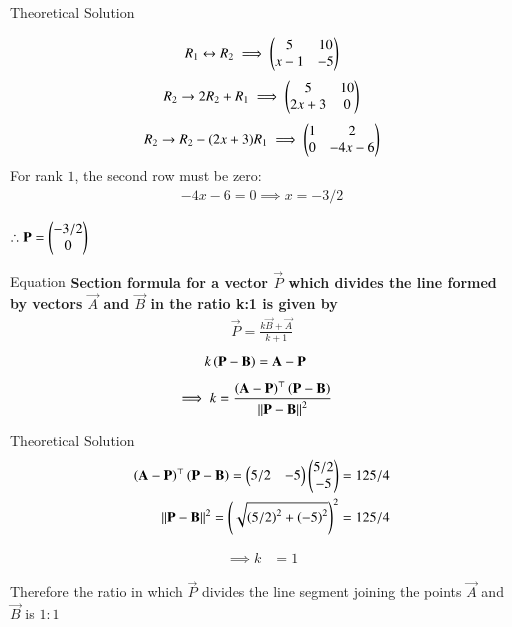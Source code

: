 \documentclass{beamer}
\begin{document}
\begin{frame}{Theoretical Solution}

\begin{align}
R_1 \leftrightarrow R_2 \implies \begin{pmatrix}5 & 10\\x-1 & -5\end{pmatrix}
\end{align}
\begin{align}
R_2 \rightarrow 2R_2 + R_1 \implies \begin{pmatrix}5 & 10\\2x+3 & 0\end{pmatrix}
\end{align}
\begin{align}
R_2 \rightarrow R_2-(2x+3)R_1 \implies \begin{pmatrix}1 & 2 \\ 0 & -4x-6\end{pmatrix}
\end{align}
For rank $1$, the second row must be zero:
\begin{align}
    -4x-6=0 \implies x=-3/2
\end{align}
\begin{center}
$\therefore \vec{P}=\begin{myvec}{-3/2\\0}\end{myvec}$
\end{center}
\end{frame}

\begin{frame}{Equation}
\textbf{Section formula for a vector $\vec{P}$ which divides the line formed by vectors $\vec{A}$ and $\vec{B}$ in the ratio k:1 is given by}
\begin{align}
    \vec{P}=\frac{k\vec{B}+\vec{A}}{k+1}
\end{align}
\begin{align}
			k\left(\mathbf{P}-\mathbf{B}\right)&= \mathbf{A}-\mathbf{P}
\end{align}
\begin{align}
			\implies k &=
			\frac{\left(\mathbf{A}-\mathbf{P}\right)^{\top}\left(\mathbf{P}-\mathbf{B}\right)}{\left\lVert\mathbf{P}-\mathbf{B}\right\rVert^2}
			\label{eq:section_formula-k}
\end{align}
\end{frame}
\begin{frame}{Theoretical Solution}
\begin{align}
\left(\mathbf{A}-\mathbf{P}\right)^{\top}\left(\mathbf{P}-\mathbf{B}\right) = \begin{pmatrix}5/2 & -5\end{pmatrix}\begin{pmatrix}5/2\\-5\end{pmatrix} = 125/4\\
{\left\lVert\mathbf{P}-\mathbf{B}\right\rVert^2} = \left(\sqrt{\left(5/2\right)^2 + \left(-5\right)^2}\right)^2 = 125/4
\end{align}

\begin{align}
\implies k &= 1
\end{align}

Therefore the ratio in which $\vec{P}$ divides the line segment joining the points $\vec{A}$ and $\vec{B}$ is $1:1$\\
\end{frame}
\end{document}
